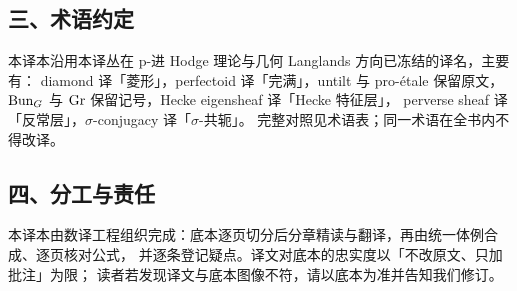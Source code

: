 \subsection*{三、术语约定}

本译本沿用本译丛在 p-进 Hodge 理论与几何 Langlands 方向已冻结的译名，主要有：
diamond 译「菱形」，perfectoid 译「完满」，untilt 与 pro-étale 保留原文，
$\mathrm{Bun}_G$ 与 $\mathrm{Gr}$ 保留记号，Hecke eigensheaf 译「Hecke 特征层」，
perverse sheaf 译「反常层」，$\sigma$-conjugacy 译「$\sigma$-共轭」。
完整对照见术语表；同一术语在全书内不得改译。

\subsection*{四、分工与责任}

本译本由数译工程组织完成：底本逐页切分后分章精读与翻译，再由统一体例合成、逐页核对公式，
并逐条登记疑点。译文对底本的忠实度以「不改原文、只加批注」为限；
读者若发现译文与底本图像不符，请以底本为准并告知我们修订。
